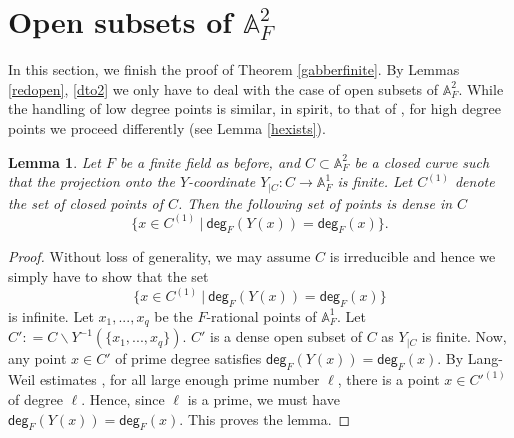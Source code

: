 \documentclass[10pt]{amsart}
\theoremstyle{plain}
\newtheorem{lemma}[thm]{Lemma}
\theoremstyle{definition}
\newcommand{\A}{{\mathbb A}}
\let\syn\mathsf
\newcommand{\dg}{\syn{deg}}
\begin{document}
\section{Open subsets of $\A^2_F$}
In this section, we finish the proof of Theorem \ref{gabberfinite}. By Lemmas \ref{redopen}, \ref{dto2} we only have to deal with the case of open subsets of $\A^2_F$. While the handling of low degree points is similar, in spirit, to that of \cite{poonen}, for high degree points we proceed differently (see Lemma \ref{hexists}). 

\begin{lemma}\label{prime}
Let $F$ be a finite field as before, and  $C \subset \A^2_F$ be a closed  curve such that the projection 
onto the $Y$-coordinate $Y_{|C} : C\to \A^1_F$ is finite. Let $C^{(1)}$ denote the set of closed points of $C$. Then the following set of points is dense in $C$
	$$ \big\{ x \in C^{(1)} \ |  \ \dg_{{F}}(Y(x)) = \dg_{{F}}(x) \big\}.$$ 
\end{lemma}
\begin{proof} Without loss of generality, we may assume $C$ is irreducible and hence we simply have to show that the set $$ \big\{ x \in C^{(1)} \ | \ \dg_{{F}}(Y(x)) = \dg_{{F}}(x) \big\}$$ is infinite. Let $x_1,...,x_q$ be the $F$-rational points of $\A^1_F$. Let $C' : = C\backslash Y^{-1}(\{x_1,...,x_q\})$. $C'$ is a dense open subset of $C$ as $Y_{|C}$ is finite. Now, any point $x \in C'$ of prime degree satisfies $\dg_{{F}}(Y(x))=\dg_{{F}}(x)$.  By Lang-Weil estimates \cite{lw}, for all large enough prime number $\ell$, there is a point $x\in C'^{(1)}$ of degree $\ell$.  Hence, since $\ell$ is a prime, we must have $\dg_{{F}}(Y(x))=\dg_{{F}}(x)$. This proves the lemma. 
\end{proof}
\end{document}
